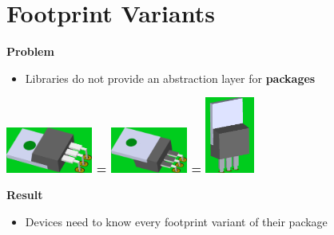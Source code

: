 \section{Footprint Variants}

\begin{frame}{\secname}
  \textbf{Problem}
  \begin{itemize}
    \item Libraries do not provide an abstraction layer for \textbf{packages}\\
  \end{itemize}

  \begin{center}
    \Huge\textbf{
      \includegraphics[height=15mm,align=c]{images/TO220_package_normal.png} =
      \includegraphics[height=15mm,align=c]{images/TO220_package_reverse.png} =
      \includegraphics[height=25mm,align=c]{images/TO220_package_vertical.png}
    }
  \end{center}

  \pause

  \textbf{Result}
  \begin{itemize}
    \item Devices need to know every footprint variant of their package
  \end{itemize}
\end{frame}

